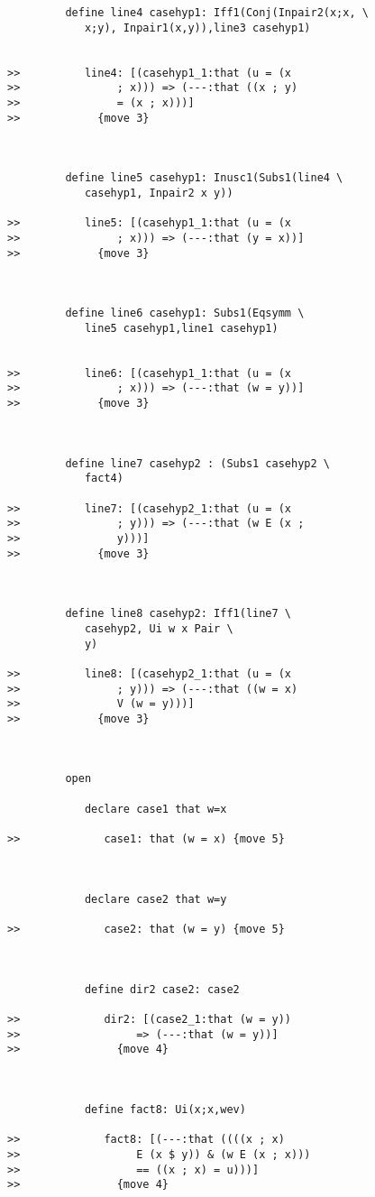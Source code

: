 \documentclass[12pt]{article}
\begin{document}
\begin{verbatim}
         define line4 casehyp1: Iff1(Conj(Inpair2(x;x, \
            x;y), Inpair1(x,y)),line3 casehyp1)


>>          line4: [(casehyp1_1:that (u = (x
>>               ; x))) => (---:that ((x ; y)
>>               = (x ; x)))]
>>            {move 3}



         define line5 casehyp1: Inusc1(Subs1(line4 \
            casehyp1, Inpair2 x y))

>>          line5: [(casehyp1_1:that (u = (x
>>               ; x))) => (---:that (y = x))]
>>            {move 3}



         define line6 casehyp1: Subs1(Eqsymm \
            line5 casehyp1,line1 casehyp1)


>>          line6: [(casehyp1_1:that (u = (x
>>               ; x))) => (---:that (w = y))]
>>            {move 3}



         define line7 casehyp2 : (Subs1 casehyp2 \
            fact4)

>>          line7: [(casehyp2_1:that (u = (x
>>               ; y))) => (---:that (w E (x ;
>>               y)))]
>>            {move 3}



         define line8 casehyp2: Iff1(line7 \
            casehyp2, Ui w x Pair \
            y)

>>          line8: [(casehyp2_1:that (u = (x
>>               ; y))) => (---:that ((w = x)
>>               V (w = y)))]
>>            {move 3}



         open

            declare case1 that w=x

>>             case1: that (w = x) {move 5}



            declare case2 that w=y

>>             case2: that (w = y) {move 5}



            define dir2 case2: case2

>>             dir2: [(case2_1:that (w = y))
>>                  => (---:that (w = y))]
>>               {move 4}



            define fact8: Ui(x;x,wev)

>>             fact8: [(---:that ((((x ; x)
>>                  E (x $ y)) & (w E (x ; x)))
>>                  == ((x ; x) = u)))]
>>               {move 4}




\end{verbatim}
\end{document}
